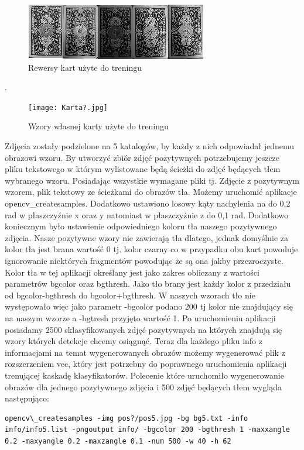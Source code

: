 \documentclass{article}
\numberwithin{equation}{section}
\begin{document}
\begin{figure}[H]
\centering
\includegraphics[scale=1.0]{RewersyKarty.jpg}
\caption{Rewersy kart użyte do treningu}
\label{fig:KartaRewers}
\end{figure}
.

\begin{figure}[H]
\centering
\texttt{[image: Karta?.jpg]}
\caption{Wzory własnej karty użyte do treningu}
\label{fig:KartaTajemnicza}
\end{figure}

Zdjęcia zostały podzielone na 5 katalogów, by każdy z nich odpowiadał jednemu obrazowi wzoru. By utworzyć zbiór zdjęć pozytywnych potrzebujemy jeszcze pliku tekstowego w którym wylistowane będą ścieżki do zdjęć będących tłem wybranego wzoru. Posiadając wszystkie wymagane pliki tj. Zdjęcie z pozytywnym wzorem, plik tekstowy ze ścieżkami do obrazów tła. Możemy uruchomić aplikacje opencv\_createsamples. Dodatkowo ustawiono losowy kąty nachylenia na do 0,2 rad w płaszczyźnie x oraz y natomiast w płaszczyźnie z do 0,1 rad. Dodatkowo koniecznym było ustawienie odpowiedniego koloru tła naszego pozytywnego zdjęcia. Nasze pozytywne wzory nie zawierają tła dlatego, jednak domyślnie za kolor tła jest brana wartość 0 tj. kolor czarny co w przypadku obu kart powoduje ignorowanie niektórych fragmentów powodując że są ona jakby przezroczyste. Kolor tła w tej aplikacji określany jest jako zakres obliczany z wartości parametrów bgcolor oraz bgthresh. Jako tło brany jest każdy kolor z przedziału od bgcolor-bgthresh do bgcolor+bgthresh. W naszych wzorach tło nie występowało więc jako parametr -bgcolor podano 200 tj kolor nie znajdujący się na naszym wzorze a -bgtresh przyjęto wartość 1. Po uruchomieniu aplikacji posiadamy 2500 sklasyfikowanych zdjęć pozytywnych na których znajdują się wzory których detekcje chcemy osiągnąć. Teraz dla każdego pliku info z informacjami na temat wygenerowanych obrazów możemy wygenerować plik z rozszerzeniem vec, który jest potrzebny do poprawnego uruchomienia aplikacji trenującej kaskadę klasyfikatorów.
Polecenie które uruchomiło wygenerowanie obrazów dla jednego pozytywnego zdjęcia i 500 zdjęć będących tłem wygląda następująco:
\begin{lstlisting}
opencv\_createsamples -img pos?/pos5.jpg -bg bg5.txt -info info/info5.list -pngoutput info/ -bgcolor 200 -bgthresh 1 -maxxangle 0.2 -maxyangle 0.2 -maxzangle 0.1 -num 500 -w 40 -h 62
\end{lstlisting}
\newline
\end{document}
